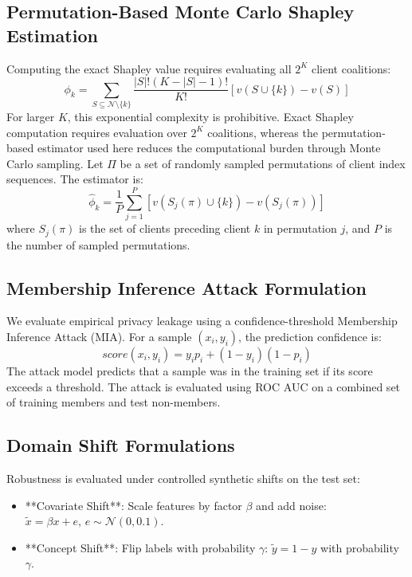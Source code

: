 \documentclass[conference]{IEEEtran}
\begin{document}
\subsection{Permutation-Based Monte Carlo Shapley Estimation}
Computing the exact Shapley value requires evaluating all $2^K$ client coalitions:
\begin{equation}
\phi_k = \sum_{S \subseteq \mathcal{N} \setminus \{k\}} \frac{|S|!(K - |S| - 1)!}{K!} \left[ v(S \cup \{k\}) - v(S) \right]
\end{equation}
For larger $K$, this exponential complexity is prohibitive. Exact Shapley computation requires evaluation over $2^K$ coalitions, whereas the permutation-based estimator used here reduces the computational burden through Monte Carlo sampling. Let $\Pi$ be a set of randomly sampled permutations of client index sequences. The estimator is:
\begin{equation}
\hat{\phi}_k = \frac{1}{P} \sum_{j=1}^P \left[ v(S_j(\pi) \cup \{k\}) - v(S_j(\pi)) \right]
\end{equation}
where $S_j(\pi)$ is the set of clients preceding client $k$ in permutation $j$, and $P$ is the number of sampled permutations.

\subsection{Membership Inference Attack Formulation}
We evaluate empirical privacy leakage using a confidence-threshold Membership Inference Attack (MIA). For a sample $(x_i, y_i)$, the prediction confidence is:
\begin{equation}
score(x_i, y_i) = y_i p_i + (1 - y_i) (1 - p_i)
\end{equation}
The attack model predicts that a sample was in the training set if its score exceeds a threshold. The attack is evaluated using ROC AUC on a combined set of training members and test non-members.

\subsection{Domain Shift Formulations}
Robustness is evaluated under controlled synthetic shifts on the test set:
\begin{itemize}
    \item **Covariate Shift**: Scale features by factor $\beta$ and add noise: $\tilde{x} = \beta x + e, \, e \sim \mathcal{N}(0, 0.1)$.
    \item **Concept Shift**: Flip labels with probability $\gamma$: $\tilde{y} = 1-y$ with probability $\gamma$.
\end{itemize}
\end{document}
